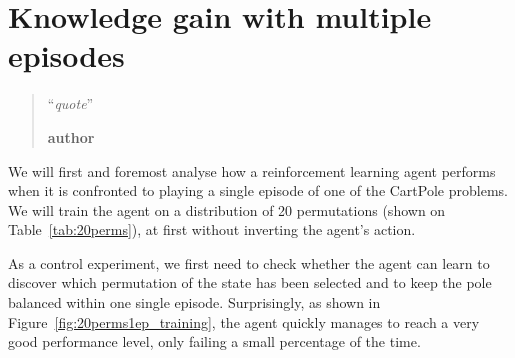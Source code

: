 \chapter{Knowledge gain with multiple episodes}
\begin{quotation}
\noindent ``\emph{quote}''
\begin{flushright}\textbf{author}\end{flushright}
\end{quotation}

We will first and foremost analyse how a reinforcement learning agent 
performs when it is confronted to playing a single episode of one of the 
CartPole problems. We will train the agent on a distribution of 20 permutations
(shown on Table~\ref{tab:20perms}), at first without inverting the agent's
action.\\

\begin{table}
	\centering
	\caption{State permutations used for training and testing}
	\label{tab:20perms}
\end{table}

As a control experiment, we first need to check whether the agent can learn
to discover which permutation of the state has been selected and to keep the
pole balanced within one single episode. Surprisingly, as shown in 
Figure~\ref{fig:20perms1ep_training}, the agent quickly manages to reach
a very good performance level, only failing a small percentage of the time.\\

